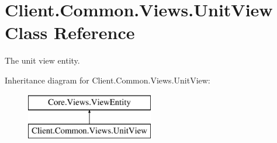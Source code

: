 \hypertarget{classClient_1_1Common_1_1Views_1_1UnitView}{}\section{Client.\+Common.\+Views.\+Unit\+View Class Reference}
\label{classClient_1_1Common_1_1Views_1_1UnitView}


The unit view entity.  


Inheritance diagram for Client.\+Common.\+Views.\+Unit\+View\+:\begin{figure}[H]
\begin{center}
\leavevmode
\includegraphics[height=2.000000cm]{classClient_1_1Common_1_1Views_1_1UnitView}
\end{center}
\end{figure}
